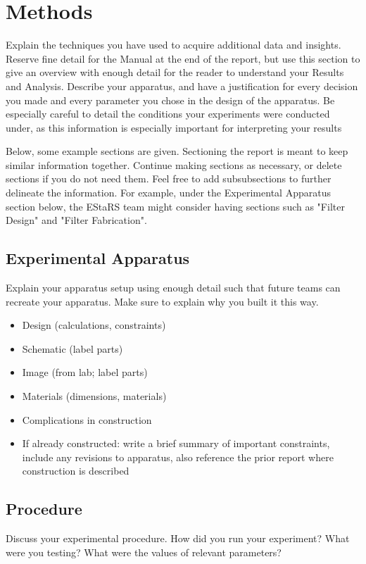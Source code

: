 \documentclass[a4paper]{article}
\begin{document}
\section*{Methods}
Explain the techniques you have used to acquire additional data and insights. Reserve fine detail for the Manual at the end of the report, but use this section to give an overview with enough detail for the reader to understand your Results and Analysis. Describe your apparatus, and have a justification for every decision you made and every parameter you chose in the design of the apparatus. Be especially careful to detail the conditions your experiments were conducted under, as this information is especially important for interpreting your results

Below, some example sections are given. Sectioning the report is meant to keep similar information together.  Continue making sections as necessary, or delete sections if you do not need them. Feel free to add subsubsections to further delineate the information. For example, under the Experimental Apparatus section below, the EStaRS team might consider having sections such as "Filter Design" and "Filter Fabrication".

\subsection*{Experimental Apparatus}
Explain your apparatus setup using enough detail such that future teams can recreate your apparatus. Make sure to explain why you built it this way.
\begin{itemize}
\item Design (calculations, constraints)
\item Schematic (label parts)
\item Image (from lab; label parts)
\item Materials (dimensions, materials)
\item Complications in construction
\item If already constructed: write a brief summary of important constraints, include any revisions to apparatus, also reference the prior report where construction is described
\end{itemize}

\subsection*{Procedure }
Discuss your experimental procedure. How did you run your experiment? What were you testing? What were the values of relevant parameters?
\end{document}
